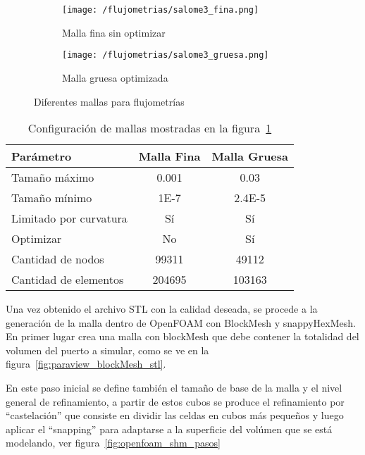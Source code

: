 \begin{figure}[t!]
    \centering
    \begin{subfigure}[t]{0.5\textwidth}
        \centering
        \texttt{[image: /flujometrias/salome3\_fina.png]}
        \caption{Malla fina sin optimizar}
    \end{subfigure}%
    \begin{subfigure}[t]{0.5\textwidth}
        \centering
        \texttt{[image: /flujometrias/salome3\_gruesa.png]}
        \caption{Malla gruesa optimizada}
    \end{subfigure}
    \caption{Diferentes mallas para flujometrías}\label{fig:salome_fina_gruesa}
\end{figure}

\begin{table}
    \centering
    \begin{tabular}{lcc} \toprule
        Parámetro                & Malla Fina    & Malla Gruesa \\ \midrule
        Tamaño máximo            & 0.001         & 0.03 \\
        Tamaño mínimo            & 1E-7          & 2.4E-5 \\
        Limitado por curvatura   & Sí            & Sí \\
        Optimizar                & No            & Sí \\
        Cantidad de nodos        & 99311         & 49112 \\
        Cantidad de elementos    & 204695        & 103163 \\ \bottomrule
    \end{tabular}
    \caption{Configuración de mallas mostradas en la figura~\ref{fig:salome_fina_gruesa}}
    \label{tab:salome_fina_gruesa}
\end{table}

Una vez obtenido el archivo STL con la calidad deseada, se procede a la
generación de la malla dentro de OpenFOAM con BlockMesh y snappyHexMesh.
%
En primer lugar crea una malla con blockMesh que  debe contener la totalidad del
volumen del puerto a simular, como se ve en la
figura~\ref{fig:paraview_blockMesh_stl}.

En este paso inicial se define también el tamaño de base de la malla y el nivel
general de refinamiento, a partir de estos cubos se produce el refinamiento por
``castelación'' que consiste en dividir las celdas en cubos más pequeños y luego
aplicar el ``snapping'' para adaptarse a la superficie del volúmen que se está
modelando, ver figura~\ref{fig:openfoam_shm_pasos}
%

